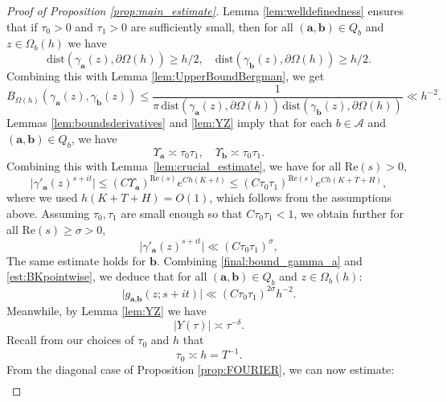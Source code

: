 \documentclass[10pt,a4paper]{amsart}
\newcommand{\Aa}{\textbf{a}}
\newcommand{\Bb}{\textbf{b}}
\begin{document}
\begin{proof}[Proof of Proposition \ref{prop:main_estimate}]
Lemma \ref{lem:welldefinedness} ensures that if $\tau_0 > 0$ and $\tau_1 > 0$ are sufficiently small, then for all $(\Aa,\Bb)\in Q_b$ and $z\in \Omega_b(h)$ we have
$$
\mathrm{dist}( \gamma_{\Aa}(z), \partial \Omega(h) ) \ge h/2, \quad \mathrm{dist}( \gamma_{\Bb}(z), \partial \Omega(h) )\ge h/2.
$$
Combining this with Lemma \ref{lem:UpperBoundBergman}, we get
\begin{equation}\label{est:BKpointwise}
B_{\Omega(h)}(\gamma_{\Aa}(z), \gamma_{\Bb}(z) ) \le  \frac{1}{\pi\, \mathrm{dist}( \gamma_{\Aa}(z), \partial \Omega(h) )\, \mathrm{dist}( \gamma_{\Bb}(z), \partial \Omega(h) ) } \ll h^{-2}.
\end{equation}
Lemmas \ref{lem:boundsderivatives} and \ref{lem:YZ} imply that for each $b\in \mathcal{A}$ and $(\Aa,\Bb)\in Q_b$, we have 
$$
\Upsilon_{\Aa}  \asymp \tau_0 \tau_1, \quad \Upsilon_{\Bb}  \asymp \tau_0 \tau_1.
$$
Combining this with Lemma~\ref{lem:crucial_estimate}, we have for all $\mathrm{Re}(s) > 0,$
\begin{equation}
\vert \gamma'_{\Aa}(z)^{s+it} \vert \le  (C\Upsilon_{\Aa})^{\mathrm{Re}(s)} e^{C h (K+t)} \le ( C\tau_0 \tau_1 )^{\mathrm{Re}(s)} e^{C h (K+T+H)},
\end{equation}
where we used $h(K+T+H) = O(1) $, which follows from the assumptions above. Assuming $\tau_0, \tau_1$ are small enough so that $C\tau_0 \tau_1 < 1$, we obtain further for all $\mathrm{Re}(s) \ge \sigma > 0,$
\begin{equation}\label{final:bound_gamma_a}
\vert \gamma'_{\Aa}(z)^{s+it} \vert \ll ( C\tau_0 \tau_1 )^{\sigma},
\end{equation}
The same estimate holds for $\Bb$. Combining \eqref{final:bound_gamma_a} and \eqref{est:BKpointwise}, we deduce that for all $(\Aa,\Bb)\in Q_b$ and $z\in \Omega_b(h)$:
\begin{equation}\label{est:pointwisegab}
\vert g_{\Aa, \Bb}(z;s+it) \vert \ll  ( C\tau_0 \tau_1 )^{2\sigma} h^{-2}.
\end{equation}
Meanwhile, by Lemma \ref{lem:YZ} we have
\begin{equation}\label{final:bound_ytau}
\vert Y(\tau)\vert \asymp \tau^{-\delta}.
\end{equation}
Recall from our choices of $\tau_0$ and $h$ that
\begin{equation}\label{final:bound_tau0}
\tau_0 \asymp h = T^{-1}.
\end{equation}
From the diagonal case of Proposition \ref{prop:FOURIER}, we can now estimate:
\begin{align}

\end{align}
\end{proof}
\end{document}
